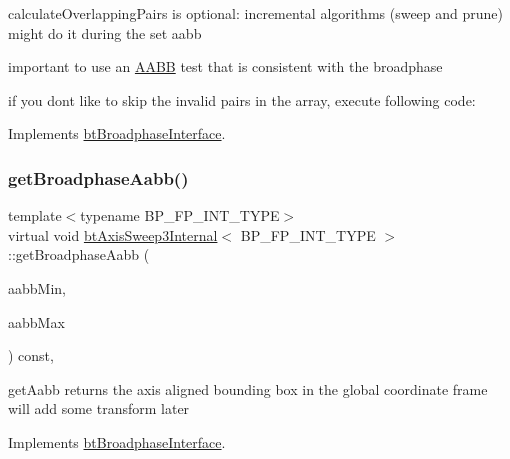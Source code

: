 calculate\+Overlapping\+Pairs is optional\+: incremental algorithms (sweep and prune) might do it during the set aabb 

important to use an \hyperlink{classAABB}{A\+A\+BB} test that is consistent with the broadphase

if you don\textquotesingle{}t like to skip the invalid pairs in the array, execute following code\+: 

Implements \hyperlink{classbtBroadphaseInterface_a27e29cb6fd31e5fe626e7ba973e67ddb}{bt\+Broadphase\+Interface}.

\mbox{\label{classbtAxisSweep3Internal_ad1e0037e1ed62ef5049389bb4e8fd5b5}} 
\subsubsection{\texorpdfstring{get\+Broadphase\+Aabb()}{getBroadphaseAabb()}\hspace{0.1cm}{\footnotesize\ttfamily [1/2]}}
{\footnotesize\ttfamily template$<$typename B\+P\+\_\+\+F\+P\+\_\+\+I\+N\+T\+\_\+\+T\+Y\+PE$>$ \\
virtual void \hyperlink{classbtAxisSweep3Internal}{bt\+Axis\+Sweep3\+Internal}$<$ B\+P\+\_\+\+F\+P\+\_\+\+I\+N\+T\+\_\+\+T\+Y\+PE $>$\+::get\+Broadphase\+Aabb (\begin{DoxyParamCaption}\item[{bt\+Vector3 \&}]{aabb\+Min,  }\item[{bt\+Vector3 \&}]{aabb\+Max }\end{DoxyParamCaption}) const\hspace{0.3cm}{\ttfamily [inline]}, {\ttfamily [virtual]}}

get\+Aabb returns the axis aligned bounding box in the \textquotesingle{}global\textquotesingle{} coordinate frame will add some transform later 

Implements \hyperlink{classbtBroadphaseInterface_ab5af9e26414f5a72a76040b8fab4d9e2}{bt\+Broadphase\+Interface}.

\mbox{\label{classbtAxisSweep3Internal_ad1e0037e1ed62ef5049389bb4e8fd5b5}} 
